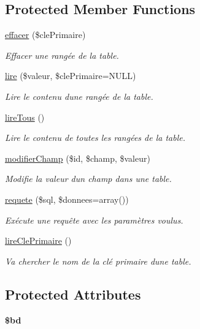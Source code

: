 \subsection*{Protected Member Functions}
\begin{DoxyCompactItemize}
\item 
\hyperlink{class_base_d_a_o_a79b3c59f05fbe64f3e3f5bc9dd4037bd}{effacer} (\$cle\+Primaire)
\begin{DoxyCompactList}\small\item\em Effacer une rangée de la table. \end{DoxyCompactList}\item 
\hyperlink{class_base_d_a_o_aacee08a4ba93803b0bb46ecd253da4bb}{lire} (\$valeur, \$cle\+Primaire=N\+U\+LL)
\begin{DoxyCompactList}\small\item\em Lire le contenu d\textquotesingle{}une rangée de la table. \end{DoxyCompactList}\item 
\hyperlink{class_base_d_a_o_a32c8bf9c85d3429f33a1bf26d274344f}{lire\+Tous} ()
\begin{DoxyCompactList}\small\item\em Lire le contenu de toutes les rangées de la table. \end{DoxyCompactList}\item 
\hyperlink{class_base_d_a_o_a298f2ea2afb2c34c5e6152ddcbefd635}{modifier\+Champ} (\$id, \$champ, \$valeur)
\begin{DoxyCompactList}\small\item\em Modifie la valeur d\textquotesingle{}un champ dans une table. \end{DoxyCompactList}\item 
\hyperlink{class_base_d_a_o_ac1400d06d7df092961487445f6b0adb8}{requete} (\$sql, \$donnees=array())
\begin{DoxyCompactList}\small\item\em Exécute une requête avec les paramètres voulus. \end{DoxyCompactList}\item 
\hyperlink{class_base_d_a_o_a2f23af522b46d32e9327279dab722579}{lire\+Cle\+Primaire} ()
\begin{DoxyCompactList}\small\item\em Va chercher le nom de la clé primaire d\textquotesingle{}une table. \end{DoxyCompactList}\end{DoxyCompactItemize}
\subsection*{Protected Attributes}
\begin{DoxyCompactItemize}
\item 
\mbox{\label{class_base_d_a_o_a1271d3e48731994630b5d62825607f66}} 
{\bfseries \$bd}
\end{DoxyCompactItemize}


